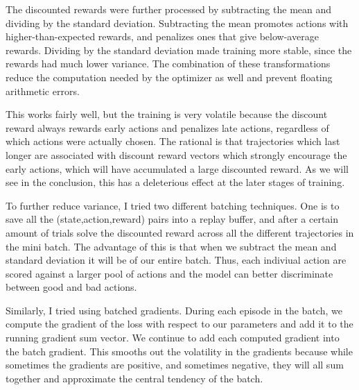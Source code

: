 \documentclass[12pt,a4paper]{article}
\begin{document}
The discounted rewards were further processed by subtracting the mean and dividing by the standard deviation. Subtracting the mean promotes actions with higher-than-expected rewards, and penalizes ones that give below-average rewards. Dividing by the standard deviation made training more stable, since the rewards had much lower variance. The combination of these transformations reduce the computation needed by the optimizer as well and prevent floating arithmetic errors.

This works fairly well, but the training is very volatile because the discount reward always rewards early actions and penalizes late actions, regardless of which actions were actually chosen. The rational is that trajectories which last longer are associated with discount reward vectors which strongly encourage the early actions, which will have accumulated a large discounted reward. As we will see in the conclusion, this has a deleterious effect at the later stages of training.

To further reduce variance, I tried two different batching techniques. One is to save all the (state,action,reward) pairs into a replay buffer, and after a certain amount of trials solve the discounted reward across all the different trajectories in the mini batch. The advantage of this is that when we subtract the mean and standard deviation it will be of our entire batch. Thus, each indiviual action are scored against a larger pool of actions and the model can better discriminate between good and bad actions.

Similarly, I tried using batched gradients. During each episode in the batch, we compute the gradient of the loss with respect to our parameters and add it to the running gradient sum vector. We continue to add each computed gradient into the batch gradient. This smooths out the volatility in the gradients because while sometimes the gradients are positive, and sometimes negative, they will all sum together and approximate the central tendency of the batch.
\end{document}
